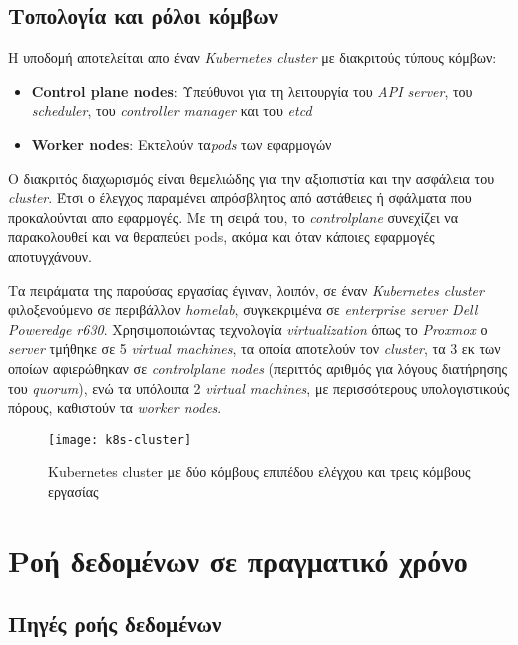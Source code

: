 \subsection{Τοπολογία και ρόλοι κόμβων}

Η υποδομή αποτελείται απο έναν \textit{Kubernetes cluster} με διακριτούς τύπους
κόμβων:

\begin{itemize}
	\item{\textbf{Control plane nodes}: Υπεύθυνοι για τη λειτουργία
	      του \textit{API server}, του \textit{scheduler}, του \textit{controller
		      manager} και του \textit{etcd}}
	\item{\textbf{Worker nodes}: Εκτελούν τα\textit{pods} των εφαρμογών}
\end{itemize}

Ο διακριτός διαχωρισμός είναι θεμελιώδης για την αξιοπιστία και την ασφάλεια
του \textit{cluster}. Έτσι ο έλεγχος παραμένει απρόσβλητος από αστάθειες ή
σφάλματα που προκαλούνται απο εφαρμογές. Με τη σειρά του, το
\textit{controlplane} συνεχίζει να παρακολουθεί και να θεραπεύει pods, ακόμα
και όταν κάποιες εφαρμογές αποτυγχάνουν.

Τα πειράματα της παρούσας εργασίας έγιναν, λοιπόν, σε έναν \textit{Kubernetes
	cluster} φιλοξενούμενο σε περιβάλλον \textit{homelab}, συγκεκριμένα σε
\textit{enterprise server Dell Poweredge r630}. Χρησιμοποιώντας τεχνολογία
\textit{virtualization} όπως το \textit{Proxmox} ο \textit{server} τμήθηκε σε 5
\textit{virtual machines}, τα οποία αποτελούν τον \textit{cluster}, τα 3 εκ των
οποίων αφιερώθηκαν σε \textit{controlplane nodes} (περιττός αριθμός για λόγους
διατήρησης του \textit{quorum}), ενώ τα υπόλοιπα 2 \textit{virtual machines},
με περισσότερους υπολογιστικούς πόρους, καθιστούν τα \textit{worker nodes}.

\begin{figure}[H]
	\centering
	\texttt{[image: k8s-cluster]}
	\caption{Kubernetes cluster με δύο κόμβους επιπέδου ελέγχου και τρεις κόμβους εργασίας}
	\label{fig:k8s-cluster}
\end{figure}

\section{Ροή δεδομένων σε πραγματικό χρόνο}

\subsection{Πηγές ροής δεδομένων}

